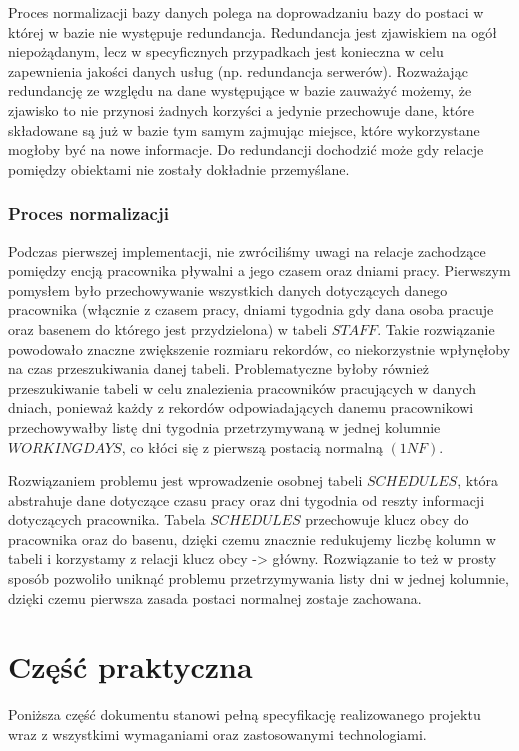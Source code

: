 \documentclass[a4paper]{article}
\begin{document}
Proces normalizacji bazy danych polega na doprowadzaniu bazy do postaci w której w bazie nie występuje redundancja. Redundancja jest zjawiskiem na ogół niepożądanym, lecz w specyficznych przypadkach jest konieczna w celu zapewnienia jakości danych usług (np. redundancja serwerów). Rozważając redundancję ze względu na dane występujące w bazie zauważyć możemy, że zjawisko to nie przynosi żadnych korzyści a jedynie przechowuje dane, które składowane są już w bazie tym samym zajmując miejsce, które wykorzystane mogłoby być na nowe informacje. Do redundancji dochodzić może gdy relacje pomiędzy obiektami nie zostały dokładnie przemyślane.

\subsubsection{Proces normalizacji}

Podczas pierwszej implementacji, nie zwróciliśmy uwagi na relacje zachodzące pomiędzy encją pracownika pływalni a jego czasem oraz dniami pracy. Pierwszym pomysłem było przechowywanie wszystkich danych dotyczących danego pracownika (włącznie z czasem pracy, dniami tygodnia gdy dana osoba pracuje oraz basenem do którego jest przydzielona) w tabeli $STAFF$. Takie rozwiązanie powodowało znaczne zwiększenie rozmiaru rekordów, co niekorzystnie wpłynęłoby na czas przeszukiwania danej tabeli. Problematyczne byłoby również przeszukiwanie tabeli w celu znalezienia pracowników pracujących w danych dniach, ponieważ każdy z rekordów odpowiadających danemu pracownikowi przechowywałby listę dni tygodnia przetrzymywaną w jednej kolumnie $WORKINGDAYS$, co kłóci się z pierwszą postacią normalną $(1NF)$.

Rozwiązaniem problemu jest wprowadzenie osobnej tabeli $SCHEDULES$, która abstrahuje dane dotyczące czasu pracy oraz dni tygodnia od reszty informacji dotyczących pracownika. Tabela $SCHEDULES$ przechowuje klucz obcy do pracownika oraz do basenu, dzięki czemu znacznie redukujemy liczbę kolumn w tabeli i korzystamy z relacji klucz obcy -> główny. Rozwiązanie to też w prosty sposób pozwoliło uniknąć problemu przetrzymywania listy dni w jednej kolumnie, dzięki czemu pierwsza zasada postaci normalnej zostaje zachowana.

\section{Część praktyczna}

Poniższa część dokumentu stanowi pełną specyfikację realizowanego projektu wraz z wszystkimi wymaganiami oraz zastosowanymi technologiami.
\end{document}
